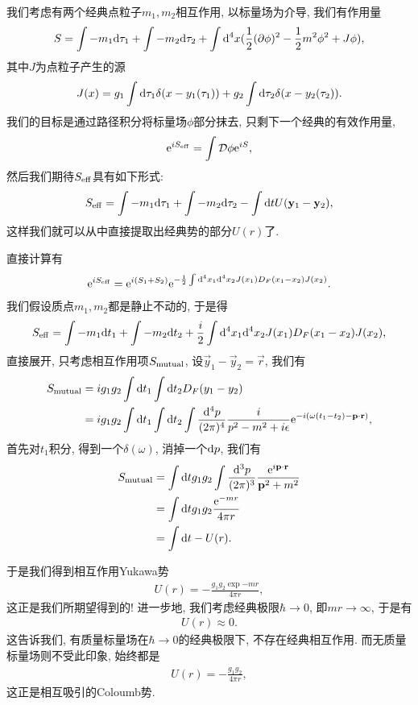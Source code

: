 我们考虑有两个经典点粒子$m_1, m_2$相互作用, 以标量场为介导, 我们有作用量
\begin{align}
    S=\int -m_1\d\tau_1+\int-m_2\d\tau_2+\int\d^4x(\frac12(\partial\phi)^2-\frac12 m^2\phi^2+J\phi),
\end{align}
其中$J$为点粒子产生的源
\begin{align}
    J(x)=g_1\int\d\tau_1\delta(x-y_1(\tau_1))+g_2\int\d\tau_2\delta(x-y_2(\tau_2)).
\end{align}
我们的目标是通过路径积分将标量场$\phi$部分抹去, 只剩下一个经典的有效作用量, 
\begin{align}
    \exp{iS_{\rm{eff}}}=\int\mathcal D\phi\exp{iS},
\end{align}
然后我们期待$S_{\rm{eff}}$具有如下形式:
\begin{align}
    S_{\rm{eff}}=\int -m_1\d\tau_1+\int-m_2\d\tau_2-\int\d t U(\vec y_1-\vec y_2),
\end{align}
这样我们就可以从中直接提取出经典势的部分$U(r)$了.

直接计算有
\begin{align}
    \exp{iS_{\rm{eff}}}=\exp{i(S_1+S_2)}\exp{-\frac12\int\d^4x_1\d^4x_2J(x_1)D_F(x_1-x_2)J(x_2)}.
\end{align}
我们假设质点$m_1, m_2$都是静止不动的, 于是得
\begin{align}
    S_{\rm{eff}}=\int -m_1\d t_1+\int-m_2\d t_2+\frac i2\int\d^4x_1\d^4x_2J(x_1)D_F(x_1-x_2)J(x_2),
\end{align}
直接展开, 只考虑相互作用项$S_{\rm{mutual}}$, 设$\vec y_1-\vec y_2=\vec r$, 我们有
\begin{align}
    S_{\rm{mutual}}&=i g_1g_2\int\d t_1\int\d t_2 D_F(y_1-y_2)\\
    &=i g_1g_2\int\d t_1\int\d t_2\int\dddd p\frac i{p^2-m^2+i\epsilon}\exp{-i(\omega(t_1-t_2)-\vec p\cdot\vec r)},
\end{align}
首先对$t_1$积分, 得到一个$\delta(\omega)$, 消掉一个$\d p$, 我们有
\begin{align}
    S_{\rm{mutual}}&=\int\d tg_1g_2\int\ddd p\frac{\exp{i\vec p\cdot\vec r}}{\vec p^2+m^2}\\
    &=\int\d tg_1g_2\frac{\exp{-mr}}{4\pi r}\\
    &=\int\d t-U(r).
\end{align}

于是我们得到相互作用Yukawa势
\begin{align}
    U(r)=-\frac{g_1g_2\exp{-mr}}{4\pi r},
\end{align}
这正是我们所期望得到的! 进一步地, 我们考虑经典极限$\hbar\to 0$, 即$mr\to\infty$, 于是有
\begin{align}
    U(r)\approx0.
\end{align}
这告诉我们, 有质量标量场在$\hbar\to 0$的经典极限下, 不存在经典相互作用. 而无质量标量场则不受此印象, 始终都是
\begin{align}
    U(r)=-\frac{g_1g_2}{4\pi r}, 
\end{align}
这正是相互吸引的Coloumb势.

